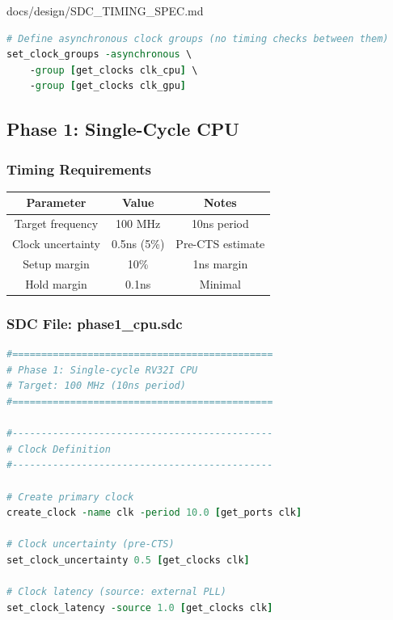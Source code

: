 \begin{relocated}{docs/design/SDC_TIMING_SPEC.md}
\begin{lstlisting}[language=tcl]
# Define asynchronous clock groups (no timing checks between them)
set_clock_groups -asynchronous \
    -group [get_clocks clk_cpu] \
    -group [get_clocks clk_gpu]
\end{lstlisting}

\subsection{Phase 1: Single-Cycle CPU}\label{ds:ch:sdc-timing-spec:phase-1-single-cycle-cpu}

\subsubsection{Timing Requirements}\label{ds:ch:sdc-timing-spec:timing-requirements}

{
\begin{longtable}[]{@{}ccc@{}}
\toprule\noalign{}
Parameter & Value & Notes \\
\midrule\noalign{}
\endhead
\bottomrule\noalign{}
\endlastfoot
Target frequency & 100 MHz & 10ns period \\
Clock uncertainty & 0.5ns (5\%) & Pre-CTS estimate \\
Setup margin & 10\% & 1ns margin \\
Hold margin & 0.1ns & Minimal \\
\end{longtable}
}

\subsubsection{\texorpdfstring{SDC File:
phase1\_\allowbreak{}cpu.sdc}{SDC File: phase1\_cpu.sdc}}\label{ds:ch:sdc-timing-spec:sdc-file-phase1-cpusdc}

\begin{lstlisting}[language=tcl]
#=============================================
# Phase 1: Single-cycle RV32I CPU
# Target: 100 MHz (10ns period)
#=============================================

#---------------------------------------------
# Clock Definition
#---------------------------------------------

# Create primary clock
create_clock -name clk -period 10.0 [get_ports clk]

# Clock uncertainty (pre-CTS)
set_clock_uncertainty 0.5 [get_clocks clk]

# Clock latency (source: external PLL)
set_clock_latency -source 1.0 [get_clocks clk]


\end{lstlisting}
\end{relocated}
